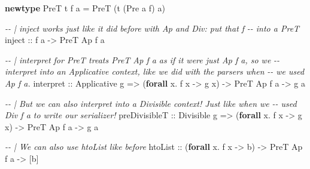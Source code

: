 \documentclass[]{article}
\newenvironment{Shaded}{}{}
\newcommand{\CommentTok}[1]{\textcolor[rgb]{0.38,0.63,0.69}{\textit{#1}}}
\newcommand{\DataTypeTok}[1]{\textcolor[rgb]{0.56,0.13,0.00}{#1}}
\newcommand{\KeywordTok}[1]{\textcolor[rgb]{0.00,0.44,0.13}{\textbf{#1}}}
\newcommand{\NormalTok}[1]{#1}
\newcommand{\OperatorTok}[1]{\textcolor[rgb]{0.40,0.40,0.40}{#1}}
\newcommand{\OtherTok}[1]{\textcolor[rgb]{0.00,0.44,0.13}{#1}}
\begin{document}
\begin{Shaded}
\begin{Highlighting}[]
\KeywordTok{newtype} \DataTypeTok{PreT}\NormalTok{ t f a }\OtherTok{=} \DataTypeTok{PreT}\NormalTok{ (t (}\DataTypeTok{Pre}\NormalTok{ a f) a)}

\CommentTok{{-}{-} | \textasciigrave{}inject\textasciigrave{} works just like it did before with \textasciigrave{}Ap\textasciigrave{} and \textasciigrave{}Div\textasciigrave{}: put that \textasciigrave{}f\textasciigrave{}}
\CommentTok{{-}{-} into a \textasciigrave{}PreT\textasciigrave{}}
\OtherTok{inject ::}\NormalTok{ f a }\OtherTok{{-}\textgreater{}} \DataTypeTok{PreT} \DataTypeTok{Ap}\NormalTok{ f a}

\CommentTok{{-}{-} | interpret for PreT treats \textasciigrave{}PreT Ap f a\textasciigrave{} as if it were just \textasciigrave{}Ap f a\textasciigrave{}, so we}
\CommentTok{{-}{-} interpret into an \textasciigrave{}Applicative\textasciigrave{} context, like we did with the parsers when}
\CommentTok{{-}{-} we used \textasciigrave{}Ap f a\textasciigrave{}.}
\NormalTok{interpret}
\OtherTok{    ::} \DataTypeTok{Applicative}\NormalTok{ g}
    \OtherTok{=\textgreater{}}\NormalTok{ (}\KeywordTok{forall}\NormalTok{ x}\OperatorTok{.}\NormalTok{ f x }\OtherTok{{-}\textgreater{}}\NormalTok{ g x)}
    \OtherTok{{-}\textgreater{}} \DataTypeTok{PreT} \DataTypeTok{Ap}\NormalTok{ f a}
    \OtherTok{{-}\textgreater{}}\NormalTok{ g a}

\CommentTok{{-}{-} | But we can also interpret into a \textasciigrave{}Divisible\textasciigrave{} context!  Just like when we}
\CommentTok{{-}{-} used \textasciigrave{}Div f a\textasciigrave{} to write our serializer!}
\NormalTok{preDivisibleT}
\OtherTok{    ::} \DataTypeTok{Divisible}\NormalTok{ g}
    \OtherTok{=\textgreater{}}\NormalTok{ (}\KeywordTok{forall}\NormalTok{ x}\OperatorTok{.}\NormalTok{ f x }\OtherTok{{-}\textgreater{}}\NormalTok{ g x)}
    \OtherTok{{-}\textgreater{}} \DataTypeTok{PreT} \DataTypeTok{Ap}\NormalTok{ f a}
    \OtherTok{{-}\textgreater{}}\NormalTok{ g a}

\CommentTok{{-}{-} | We can also use htoList like before}
\NormalTok{htoList}
\OtherTok{    ::}\NormalTok{ (}\KeywordTok{forall}\NormalTok{ x}\OperatorTok{.}\NormalTok{ f x }\OtherTok{{-}\textgreater{}}\NormalTok{ b)}
    \OtherTok{{-}\textgreater{}} \DataTypeTok{PreT} \DataTypeTok{Ap}\NormalTok{ f a}
    \OtherTok{{-}\textgreater{}}\NormalTok{ [b]}
\end{Highlighting}
\end{Shaded}
\end{document}
